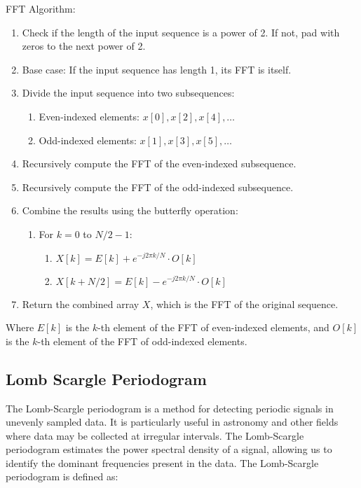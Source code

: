 FFT Algorithm:
\begin{enumerate}
    \item Check if the length of the input sequence is a power of 2. If not, pad with zeros to the next power of 2.
    \item Base case: If the input sequence has length 1, its FFT is itself.
    \item Divide the input sequence into two subsequences:
        \begin{enumerate}
            \item Even-indexed elements: $x[0], x[2], x[4], \ldots$
            \item Odd-indexed elements: $x[1], x[3], x[5], \ldots$
        \end{enumerate}
    \item Recursively compute the FFT of the even-indexed subsequence.
    \item Recursively compute the FFT of the odd-indexed subsequence.
    \item Combine the results using the butterfly operation:
        \begin{enumerate}
            \item For $k = 0$ to $N/2-1$:
                \begin{enumerate}
                    \item $X[k] = E[k] + e^{-j2\pi k/N} \cdot O[k]$
                    \item $X[k+N/2] = E[k] - e^{-j2\pi k/N} \cdot O[k]$
                \end{enumerate}
        \end{enumerate}
    \item Return the combined array $X$, which is the FFT of the original sequence.
\end{enumerate}

Where $E[k]$ is the $k$-th element of the FFT of even-indexed elements, and $O[k]$ is the $k$-th element of the FFT of odd-indexed elements.

\subsection{Lomb Scargle Periodogram}
The Lomb-Scargle periodogram is a method for detecting periodic signals in unevenly sampled data. It is particularly useful in astronomy and other fields where data may be collected at irregular intervals. The Lomb-Scargle periodogram estimates the power spectral density of a signal, allowing us to identify the dominant frequencies present in the data.
The Lomb-Scargle periodogram is defined as:

